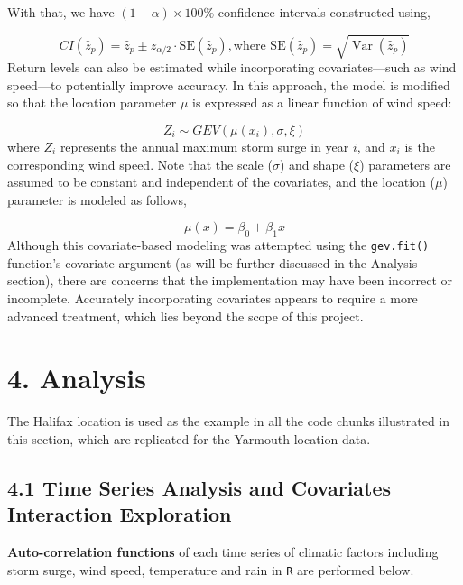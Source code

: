 \documentclass[
  letterpaper,
  DIV=11,
  numbers=noendperiod]{scrartcl}
\begin{document}
With that, we have \((1-\alpha)\times 100\%\) confidence intervals
constructed using,

\[CI(\hat z_p)=\hat z_p\pm z_{\alpha/2}\cdot\mathrm{SE}(\hat z_p), \text{where } \mathrm{SE}(\hat z_p) = \sqrt{\operatorname{Var}(\hat{z}_{p})}\]
Return levels can also be estimated while incorporating
covariates---such as wind speed---to potentially improve accuracy. In
this approach, the model is modified so that the location parameter
\(\mu\) is expressed as a linear function of wind speed:

\[Z_i \sim GEV(\mu(x_i), \sigma, \xi)\] where \(Z_i\) represents the
annual maximum storm surge in year \(i\), and \(x_i\) is the
corresponding wind speed. Note that the scale (\(\sigma\)) and shape
(\(\xi\)) parameters are assumed to be constant and independent of the
covariates, and the location (\(\mu\)) parameter is modeled as follows,

\[\mu(x) = \beta_0 + \beta_1 x\] Although this covariate-based modeling
was attempted using the \texttt{gev.fit()} function's covariate argument
(as will be further discussed in the Analysis section), there are
concerns that the implementation may have been incorrect or incomplete.
Accurately incorporating covariates appears to require a more advanced
treatment, which lies beyond the scope of this project.

\section{4. Analysis}\label{analysis}

The Halifax location is used as the example in all the code chunks
illustrated in this section, which are replicated for the Yarmouth
location data.

\subsection{4.1 Time Series Analysis and Covariates Interaction
Exploration}\label{time-series-analysis-and-covariates-interaction-exploration}

\textbf{Auto-correlation functions} of each time series of climatic
factors including storm surge, wind speed, temperature and rain in
\texttt{R} are performed below.
\end{document}
